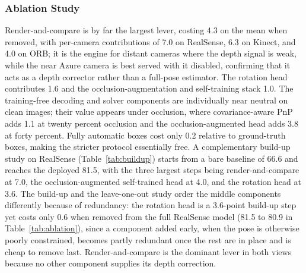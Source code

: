 \subsubsection{Ablation Study}
Render-and-compare is by far the largest lever, costing 4.3 on the mean when removed, with per-camera contributions of 7.0 on RealSense, 6.3 on Kinect, and 4.0 on ORB; it is the engine for distant cameras where the depth signal is weak, while the near Azure camera is best served with it disabled, confirming that it acts as a depth corrector rather than a full-pose estimator. The rotation head contributes 1.6 and the occlusion-augmentation and self-training stack 1.0. The training-free decoding and solver components are individually near neutral on clean images; their value appears under occlusion, where covariance-aware PnP adds 1.1 at twenty percent occlusion and the occlusion-augmented head adds 3.8 at forty percent. Fully automatic boxes cost only 0.2 relative to ground-truth boxes, making the stricter protocol essentially free. A complementary build-up study on RealSense (Table~\ref{tab:buildup}) starts from a bare baseline of 66.6 and reaches the deployed 81.5, with the three largest steps being render-and-compare at 7.0, the occlusion-augmented self-trained head at 4.0, and the rotation head at 3.6. The build-up and the leave-one-out study order the middle components differently because of redundancy: the rotation head is a 3.6-point build-up step yet costs only 0.6 when removed from the full RealSense model (81.5 to 80.9 in Table~\ref{tab:ablation}), since a component added early, when the pose is otherwise poorly constrained, becomes partly redundant once the rest are in place and is cheap to remove last. Render-and-compare is the dominant lever in both views because no other component supplies its depth correction.

